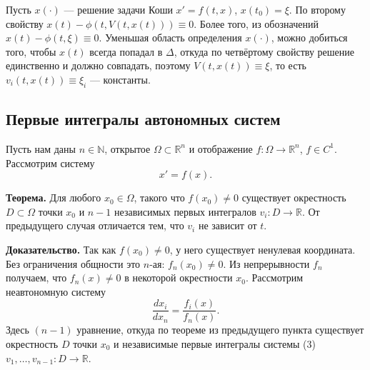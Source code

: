 Пусть $x(\cdot)$ --- решение задачи Коши $x' = f(t, x)$, $x(t_0) = \xi$.
По второму свойству $x(t) - \phi(t, V(t, x(t))) \equiv 0$.
Более того, из обозначений $x(t) - \phi(t, \xi) \equiv 0$.
Уменьшая область определения $x(\cdot)$, можно добиться того, чтобы $x(t)$ всегда попадал в $\Delta$, откуда по четвёртому свойству решение единственно и должно совпадать, поэтому $V(t, x(t)) \equiv \xi$, то есть $v_i(t, x(t)) \equiv \xi_i$ --- константы.

\QED

\subsection{Первые интегралы автономных систем}
Пусть нам даны $n \in \mathbb N$, открытое $\Omega \subset \mathbb R^n$ и отображение $f: \Omega \to \mathbb R^n$, $f \in C^1$.
Рассмотрим систему
\begin{equation}
    x' = f(x).
\end{equation}

\textbf{Теорема.} Для любого $x_0 \in \Omega$, такого что $f(x_0) \ne 0$ существует окрестность $D \subset \Omega$ точки $x_0$ и $n - 1$ независимых первых интегралов $v_i: D \to \mathbb R$.
От предыдущего случая отличается тем, что $v_i$ не зависит от $t$.

\textbf{Доказательство.}
Так как $f(x_0) \ne 0$, у него существует ненулевая координата.
Без ограничения общности это $n$-ая: $f_n(x_0) \ne 0$.
Из непрерывности $f_n$ получаем, что $f_n(x) \ne 0$ в некоторой окрестности $x_0$.
Рассмотрим неавтономную систему
\begin{equation}
    \frac{dx_i}{dx_n} = \frac{f_i(x)}{f_n(x)}.
\end{equation}
Здесь $(n - 1)$ уравнение, откуда по теореме из предыдущего пункта существует окрестность $D$ точки $x_0$ и независимые первые интегралы системы (3) $v_1, \dots, v_{n-1}: D \to \mathbb R$.

